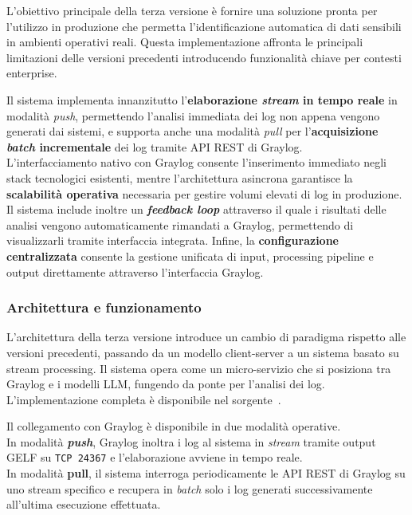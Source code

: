 \documentclass[12pt,twoside]{report}
\begin{document}
L'obiettivo principale della terza versione è fornire una soluzione pronta per l'utilizzo in produzione che permetta l'identificazione automatica di dati sensibili in ambienti operativi reali. Questa implementazione affronta le principali limitazioni delle versioni precedenti introducendo funzionalità chiave per contesti enterprise.

Il sistema implementa innanzitutto l'\textbf{elaborazione \textit{stream} in tempo reale} in modalità \textit{push}, permettendo l'analisi immediata dei log non appena vengono generati dai sistemi, e supporta anche una modalità \textit{pull} per l'\textbf{acquisizione \textit{batch} incrementale} dei log tramite API REST di Graylog.\\
L'interfacciamento nativo con Graylog consente l'inserimento immediato negli stack tecnologici esistenti, mentre l'architettura asincrona garantisce la \textbf{scalabilità operativa} necessaria per gestire volumi elevati di log in produzione. Il sistema include inoltre un \textbf{\textit{feedback loop}} attraverso il quale i risultati delle analisi vengono automaticamente rimandati a Graylog, permettendo di visualizzarli tramite interfaccia integrata. Infine, la \textbf{configurazione centralizzata} consente la gestione unificata di input, processing pipeline e output direttamente attraverso l'interfaccia Graylog.

\subsubsection{Architettura e funzionamento}
\label{subsubsec:ver3_architettura}

L'architettura della terza versione introduce un cambio di paradigma rispetto alle versioni precedenti, passando da un modello client-server a un sistema basato su stream processing. Il sistema opera come un micro-servizio che si posiziona tra Graylog e i modelli LLM, fungendo da ponte per l'analisi dei log.\\
L'implementazione completa è disponibile nel sorgente~.

Il collegamento con Graylog è disponibile in due modalità operative.\\
In modalità \textbf{\textit{push}}, Graylog inoltra i log al sistema in \textit{stream} tramite output GELF su \texttt{TCP 24367} e l'elaborazione avviene in tempo reale.\\
In modalità \textbf{pull}, il sistema interroga periodicamente le API REST di Graylog su uno stream specifico e recupera in \textit{batch} solo i log generati successivamente all'ultima esecuzione effettuata.
\end{document}
